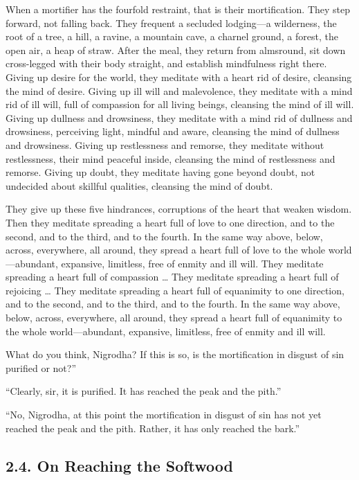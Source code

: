 \documentclass[12pt,openany]{book}%
\begin{document}
When a mortifier has the fourfold restraint, that is their mortification. They step forward, not falling back. They frequent a secluded lodging—a wilderness, the root of a tree, a hill, a ravine, a mountain cave, a charnel ground, a forest, the open air, a heap of straw. After the meal, they return from almsround, sit down cross-legged with their body straight, and establish mindfulness right there. Giving up desire for the world, they meditate with a heart rid of desire, cleansing the mind of desire. Giving up ill will and malevolence, they meditate with a mind rid of ill will, full of compassion for all living beings, cleansing the mind of ill will. Giving up dullness and drowsiness, they meditate with a mind rid of dullness and drowsiness, perceiving light, mindful and aware, cleansing the mind of dullness and drowsiness. Giving up restlessness and remorse, they meditate without restlessness, their mind peaceful inside, cleansing the mind of restlessness and remorse. Giving up doubt, they meditate having gone beyond doubt, not undecided about skillful qualities, cleansing the mind of doubt. 

They give up these five hindrances, corruptions of the heart that weaken wisdom. Then they meditate spreading a heart full of love to one direction, and to the second, and to the third, and to the fourth. In the same way above, below, across, everywhere, all around, they spread a heart full of love to the whole world—abundant, expansive, limitless, free of enmity and ill will. They meditate spreading a heart full of compassion … They meditate spreading a heart full of rejoicing … They meditate spreading a heart full of equanimity to one direction, and to the second, and to the third, and to the fourth. In the same way above, below, across, everywhere, all around, they spread a heart full of equanimity to the whole world—abundant, expansive, limitless, free of enmity and ill will. 

What do you think, Nigrodha? If this is so, is the mortification in disgust of sin purified or not?” 

“Clearly, sir, it is purified. It has reached the peak and the pith.” 

“No, Nigrodha, at this point the mortification in disgust of sin has not yet reached the peak and the pith. Rather, it has only reached the bark.” 

\subsection*{2.4. On Reaching the Softwood }
\end{document}
